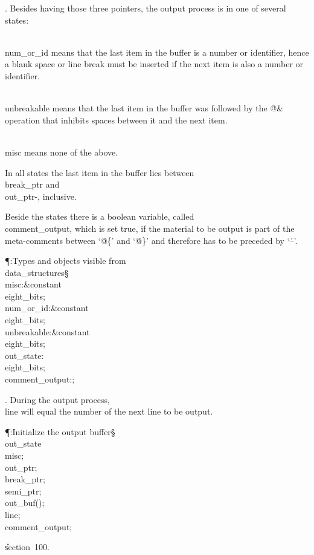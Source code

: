 . Besides having those three pointers,
the output process is in one of several states:

\yskip\hang \\{num\_or\_id} means that the last item in the buffer is a number
or
identifier, hence a blank space or line break must be inserted if the next
item is also a number or identifier.

\yskip\hang \\{unbreakable} means that the last item in the buffer was followed
by the \.{@\&} operation that inhibits spaces between it and the next item.

\yskip\hang \\{misc} means none of the above.

\yskip\noindent
In all states the last item in the buffer lies between \\{break\_ptr} and
\\{out\_ptr}\?-, inclusive.

Beside the states there is a boolean variable, called \\{comment\_output},
which is set true, if the material to be output is part of the meta-comments
between `\.{@\{}' and `\.{@\}}' and therefore has to be preceded by
`\.{--}'.

\Y\P\?\4:Types and objects visible from \\{data\_structures}\X\mathrel{+}\S%
\?\6
\\{misc}\?:\?\&{constant}\8\\{eight\_bits}\?\K{};\6
\\{num\_or\_id}\?:\?\&{constant}\8\\{eight\_bits}\?\K{};\6
\\{unbreakable}\?:\?\&{constant}\8\\{eight\_bits}\?\K{};\7
\\{out\_state}\?:\?\\{eight\_bits};\6
\\{comment\_output}\?:\?;\par
\fi

. During the output process, \\{line} will equal the number of the next
line
to be output.

\Y\P\?\4:Initialize the output buffer\X\S\?\6
\\{out\_state}\?\K\?\\{misc};\5
\\{out\_ptr}\?\K{};\5
\\{break\_ptr}\?\K{};\5
\\{semi\_ptr}\?\K{};\5
\\{out\_buf}\?\1(\?\2)\K{};\5
\\{line}\?\K{};\5
\\{comment\_output}\?\K\?;\par
\U section~100.\fi

